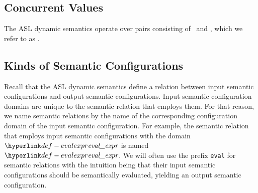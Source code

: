 \subsection{Concurrent Values\label{sec:ConcurrentValues}}
\hypertarget{def-concurrentnativevalue}{}
The ASL dynamic semantics operate over pairs consisting of \nativevalues\ and \executiongraphs,
which we refer to as \concurrentnativevalues.

\subsection{Kinds of Semantic Configurations\label{sec:KindsOfSemanticConfigurations}}

Recall that the ASL dynamic semantics define a relation between input semantic configurations and output semantic configurations.
Input semantic configuration domains are unique to the semantic relation that employs them.
For that reason, we name semantic relations by the name of the corresponding configuration domain of the input semantic configuration.
For example, the semantic relation that employs input semantic configurations with the domain $\evalexpr$
is named $\evalexpr$.
%
We will often use the prefix \texttt{eval} for semantic relations with the intuition being that their input semantic configurations
should be semantically evaluated, yielding an output semantic configuration.

